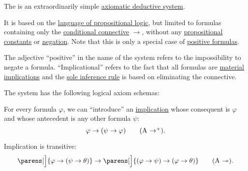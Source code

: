 \begin{definition}\label{def:positive_implicational_deductive_system}
  The  is an extraordinarily simple \hyperref[def:axiomatic_deductive_system]{axiomatic deductive system}.

  It is based on the \hyperref[def:propositional_language]{language of propositional logic}, but limited to formulas containing only the \hyperref[def:propositional_language/connectives/conditional]{conditional connective} \( \rightarrow \), without any \hyperref[def:propositional_language/constants]{propositional constants} or \hyperref[def:propositional_language/negation]{negation}. Note that this is only a special case of \hyperref[def:positive_formula]{positive formulas}.

  The adjective \enquote{positive} in the name of the system refers to the impossibility to negate a formula. \enquote{Implicational} refers to the fact that all formulas are \hyperref[def:material_implication]{material implications} and the \hyperref[eq:def:def:axiomatic_deductive_system/mp]{sole inference rule} is based on eliminating the connective.

  The system has the following logical axiom schemas:
  \begin{thmenum}
     For every formula \( \varphi \), we can \enquote{introduce} an \hyperref[def:material_implication]{implication} whose consequent is \( \varphi \) and whose antecedent is any other formula \( \psi \):
    \begin{equation}\label{eq:def:positive_implicational_deductive_system/intro}
      \varphi \rightarrow (\psi \rightarrow \varphi) \tag{\textrm{A} \( \rightarrow^+ \)}.
    \end{equation}

     Implication is transitive:
    \begin{equation}\label{eq:def:positive_implicational_deductive_system/trans}
      \parens[\Big]{ \varphi \rightarrow (\psi \rightarrow \theta) } \rightarrow \parens[\Big]{ (\varphi \rightarrow \psi) \rightarrow (\varphi \rightarrow \theta)} \tag{\textrm{A} \( \twoheadrightarrow \)}.
    \end{equation}
  \end{thmenum}
\end{definition}

